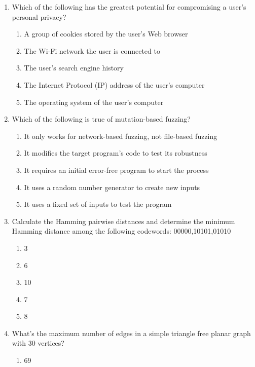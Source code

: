 \documentclass[12pt]{article}
\begin{document}
\begin{enumerate}[label=\arabic*.]
\begin{enumerate}[label=(\alph*)]
    \item 00000001, 10000000
    \item 10000001, 10101010
    \item 11111111, 00000001
\end{enumerate}
\item Which of the following has the greatest potential for compromising a user's personal privacy?
\begin{enumerate}[label=(\alph*)]
    \item A group of cookies stored by the user's Web browser
    \item The Wi-Fi network the user is connected to
    \item The user's search engine history
    \item The Internet Protocol (IP) address of the user's computer
    \item The operating system of the user's computer
\end{enumerate}
\item Which of the following is true of mutation-based fuzzing?
\begin{enumerate}[label=(\alph*)]
    \item It only works for network-based fuzzing, not file-based fuzzing
    \item It modifies the target program's code to test its robustness
    \item It requires an initial error-free program to start the process
    \item It uses a random number generator to create new inputs
    \item It uses a fixed set of inputs to test the program
\end{enumerate}
\item Calculate the Hamming pairwise distances and determine the minimum Hamming distance among the following codewords: 00000,10101,01010
\begin{enumerate}[label=(\alph*)]
    \item 3
    \item 6
    \item 10
    \item 7
    \item 8
\end{enumerate}
\item What's the maximum number of edges in a simple triangle free planar graph with 30 vertices?
\begin{enumerate}[label=(\alph*)]
    \item 69

\end{enumerate}
\end{enumerate}
\end{document}
